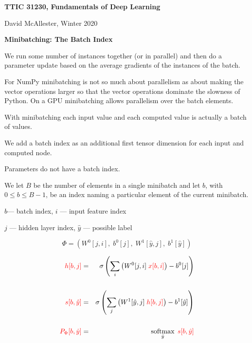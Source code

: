 




{\Huge
  
  \centerline{\bf TTIC 31230, Fundamentals of Deep Learning}
  \bigskip
  \centerline{David McAllester, Winter 2020}
  \vfill
  \vfill
  \centerline{\bf Minibatching: The Batch Index}
  \vfill
  \vfill

 
We run some number of instances together (or in parallel) and then do a parameter update based on the average
gradients of the instances of the batch.

\vfill
For NumPy minibatching is not so much about parallelism as about making the vector operations larger so that the vector operations dominate
the slowness of Python.  On a GPU minibatching allows parallelism over the batch elements.
\vfill

\vfill
With minibatching each input value and each computed value is actually a batch of values.

\vfill
We add a batch index as an additional first tensor dimension for each input and computed node.

\vfill
Parameters do not have a batch index.


We let $B$ be the number of elements in a single minibatch and let $b$, with $0 \leq b \leq B-1$, be an index naming a particular element of the current minibatch.


\centerline{$b$--- batch index,\hspace{3em} $i$ --- input feature index}
\centerline{$j$ --- hidden layer index, \hspace{3em} $\hat{y}$ --- possible label}
$$\Phi = (W^0[j,i],\;b^0[j],\;W^1[\hat{y},j],\;b^1[\hat{y}])$$

\vfill
\begin{eqnarray*}
  {\color{red} h[b,j]} & = & \sigma\left(\sum_i \left(W^0[j,i] \;{\color{red} x[b,i]}\right) - b^0[j]\right) \\
  \\
  {\color{red} s[b,\hat{y}]} & = & \sigma\left(\sum_j \left(W^1[\hat{y},j]\;{\color{red} h[b,j]}\right) - b^1[\hat{y}]\right) \\
  \\
  {\color{red} P_\Phi[b,\hat{y}]} & = & \operatorname*{softmax}_{\hat{y}}\;{\color{red} s[b,\hat{y}]}
\end{eqnarray*}

}
